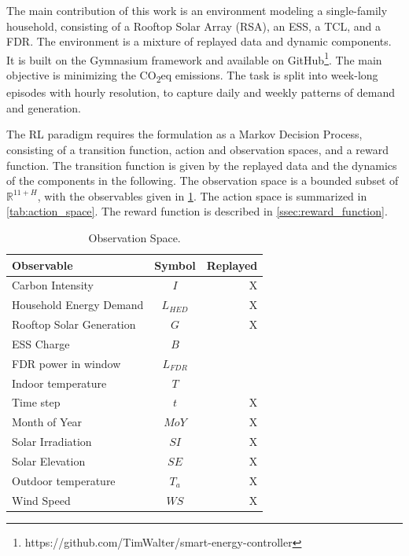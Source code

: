 The main contribution of this work is an environment modeling a single-family household, consisting of a Rooftop Solar Array (RSA), an ESS, a TCL, and a FDR. The environment is a mixture of replayed data and dynamic components. It is built on the Gymnasium framework \cite{Towers.2023} and available on GitHub\footnote{https://github.com/TimWalter/smart-energy-controller}. The main objective is minimizing the CO\textsubscript{2}eq emissions. The task is split into week-long episodes with hourly resolution, to capture daily and weekly patterns of demand and generation.
\par
The RL paradigm requires the formulation as a Markov Decision Process, consisting of a transition function, action and observation spaces, and a reward function. The transition function is given by the replayed data and the dynamics of the components in the following. The observation space is a bounded subset of $\mathbb{R}^{11+H}$, with the observables given in \cref{tab:observation_space}. The action space is summarized in  \cref{tab:action_space}. The reward function is described in \cref{ssec:reward_function}.

\begin{table}
    \caption{Observation Space.}
    \label{tab:observation_space}
    \vskip 0.15in
    \begin{center}
    \begin{small}
    \begin{sc}
    \begin{tabular}{lcr}
    \toprule
    Observable & Symbol & Replayed\\
    \midrule
    Carbon Intensity & $I$ & X\\
        Household Energy Demand & $L_{HED}$ & X\\
        Rooftop Solar Generation & $G$ & X\\
        ESS Charge & $B$ & \\
        FDR power in window & $L_{FDR}$ &\\
        Indoor temperature & $T$ & \\
        Time step & $t$ & X\\
        Month of Year & $MoY$ & X \\
        Solar Irradiation & $SI$ & X\\
        Solar Elevation & $SE$ & X\\
        Outdoor temperature & $T_a$ & X \\
        Wind Speed & $WS$ & X\\
    \bottomrule
    \end{tabular}
    \end{sc}
    \end{small}
    \end{center}
    \vskip -0.1in
    \end{table}
    
